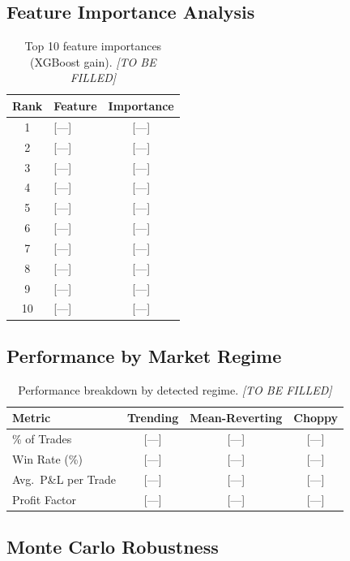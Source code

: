 \documentclass[12pt,a4paper]{article}
\begin{document}
\subsection{Feature Importance Analysis}

\begin{table}[h!]
\centering
\caption{Top 10 feature importances (XGBoost gain). \textit{[TO BE FILLED]}}
\label{tab:importance}
\begin{tabular}{@{}clc@{}}
\toprule
\textbf{Rank} & \textbf{Feature} & \textbf{Importance} \\
\midrule
1 & [---] & [---] \\
2 & [---] & [---] \\
3 & [---] & [---] \\
4 & [---] & [---] \\
5 & [---] & [---] \\
6 & [---] & [---] \\
7 & [---] & [---] \\
8 & [---] & [---] \\
9 & [---] & [---] \\
10 & [---] & [---] \\
\bottomrule
\end{tabular}
\end{table}

\subsection{Performance by Market Regime}

\begin{table}[h!]
\centering
\caption{Performance breakdown by detected regime. \textit{[TO BE FILLED]}}
\label{tab:regime_perf}
\begin{tabular}{@{}lccc@{}}
\toprule
\textbf{Metric} & \textbf{Trending} & \textbf{Mean-Reverting} & \textbf{Choppy} \\
\midrule
\% of Trades & [---] & [---] & [---] \\
Win Rate (\%) & [---] & [---] & [---] \\
Avg.\ P\&L per Trade & [---] & [---] & [---] \\
Profit Factor & [---] & [---] & [---] \\
\bottomrule
\end{tabular}
\end{table}

\subsection{Monte Carlo Robustness}
\end{document}
